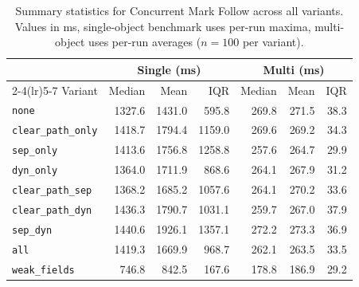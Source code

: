 \begin{table}[t]
\centering
\small
\caption{Summary statistics for Concurrent Mark Follow across all variants. Values in ms, single-object benchmark uses per-run maxima, multi-object uses per-run averages ($n=100$ per variant).}
\label{tab:stats-markfollow}
\begin{tabular}{l rrr rrr}
\toprule
 & \multicolumn{3}{c}{Single (ms)} & \multicolumn{3}{c}{Multi (ms)} \\
\cmidrule(lr){2-4}\cmidrule(lr){5-7}
Variant & Median & Mean & IQR & Median & Mean & IQR \\
\midrule
\texttt{none} & 1327.6 & 1431.0 & 595.8 & 269.8 & 271.5 & 38.3 \\
\texttt{clear\_path\_only} & 1418.7 & 1794.4 & 1159.0 & 269.6 & 269.2 & 34.3 \\
\texttt{sep\_only} & 1413.6 & 1756.8 & 1258.8 & 257.6 & 264.7 & 29.9 \\
\texttt{dyn\_only} & 1364.0 & 1711.9 & 868.6 & 264.1 & 267.9 & 31.2 \\
\texttt{clear\_path\_sep} & 1368.2 & 1685.2 & 1057.6 & 264.1 & 270.2 & 33.6 \\
\texttt{clear\_path\_dyn} & 1436.3 & 1790.7 & 1031.1 & 259.7 & 267.0 & 37.9 \\
\texttt{sep\_dyn} & 1440.6 & 1926.1 & 1357.1 & 272.2 & 273.3 & 36.9 \\
\texttt{all} & 1419.3 & 1669.9 & 968.7 & 262.1 & 263.5 & 33.5 \\
\texttt{weak\_fields} & 746.8 & 842.5 & 167.6 & 178.8 & 186.9 & 29.2 \\
\bottomrule
\end{tabular}
\end{table}
